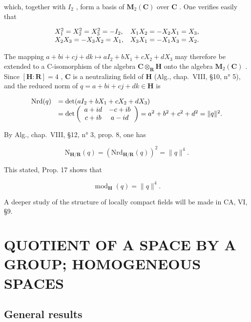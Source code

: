 which, together with \(I_2\) , form a basis of \(\mathbf{M}_2(\mathbf{C})\) over \(\mathbf{C}\) . One verifies easily that

\[
\begin{array}{l l} {X _ {1} ^ {2} = X _ {2} ^ {2} = X _ {3} ^ {2} = - I _ {2},} & {X _ {1} X _ {2} = - X _ {2} X _ {1} = X _ {3},} \\ {X _ {2} X _ {3} = - X _ {3} X _ {2} = X _ {1},} & {X _ {3} X _ {1} = - X _ {1} X _ {3} = X _ {2}.} \end{array}
\]

The mapping \(a + bi + cj + dk \mapsto aI_2 + bX_1 + cX_2 + dX_3\) may therefore be extended to a C-isomorphism of the algebra \(\mathbf{C} \otimes_{\mathbf{R}} \mathbf{H}\) onto the algebra \(\mathbf{M}_2(\mathbf{C})\) . Since \([\mathbf{H} : \mathbf{R}] = 4\) , \(\mathbf{C}\) is a neutralizing field of \(\mathbf{H}\) (Alg., chap.~VIII, §10, n° 5), and the reduced norm of \(q = a + bi + cj + dk \in \mathbf{H}\) is

\[
\begin{array}{r l} \mathrm{Nrd} (q) & = \det (a I _ {2} + b X _ {1} + c X _ {2} + d X _ {3}) \\ & = \det \left( \begin{array}{c c} a + i d & - c + i b \\ c + i b & a - i d \end{array} \right) = a ^ {2} + b ^ {2} + c ^ {2} + d ^ {2} = \| q \| ^ {2}. \end{array}
\]

By Alg., chap.~VIII, §12, n° 3, prop. 8, one has

\[
\mathrm{N} _ {\mathbf {H} / \mathbf {R}} (q) = \left(\mathrm{Nrd} _ {\mathbf {H} / \mathbf {R}} (q)\right) ^ {2} = \| q \| ^ {4}.
\]

This stated, Prop. 17 shows that

\[
\operatorname{mod} _ {\mathbf {H}} (q) = \| q \| ^ {4}.
\]

A deeper study of the structure of locally compact fields will be made in CA, VI, §9.

\section{QUOTIENT OF A SPACE BY A GROUP; HOMOGENEOUS SPACES}

\subsection{General results}

